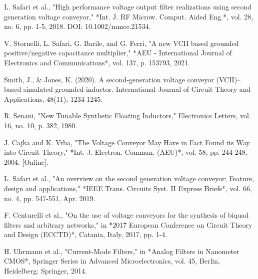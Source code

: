 \documentclass{./styles/svproc}
\begin{document}


\begin{thebibliography}{00}
 L. Safari et al., "High performance voltage output filter realizations using second generation voltage conveyor," *Int. J. RF Microw. Comput. Aided Eng.*, vol. 28, no. 6, pp. 1-5, 2018. DOI: 10.1002/mmce.21534.

V. Stornelli, L. Safari, G. Barile, and G. Ferri, "A new VCII based grounded positive/negative capacitance multiplier," *AEU - International Journal of Electronics and Communications*, vol. 137, p. 153793, 2021.

 Smith, J., \& Jones, K. (2020). A second‐generation voltage conveyor (VCII)–based simulated grounded inductor. International Journal of Circuit Theory and Applications, 48(11), 1234-1245.

 R. Senani, "New Tunable Synthetic Floating Inductors," Electronics Letters, vol. 16, no. 10, p. 382, 1980.

 J. Cajka and K. Vrba, "The Voltage Conveyor May Have in Fact Found its Way into Circuit Theory," *Int. J. Electron. Commun. (AEU)*, vol. 58, pp. 244-248, 2004. [Online].

 L. Safari et al., "An overview on the second generation voltage conveyor: Feature, design and applications," *IEEE Trans. Circuits Syst. II Express Briefs*, vol. 66, no. 4, pp. 547-551, Apr. 2019.

 F. Centurelli et al., "On the use of voltage conveyors for the synthesis of biquad filters and arbitrary networks," in *2017 European Conference on Circuit Theory and Design (ECCTD)*, Catania, Italy, 2017, pp. 1-4.

 H. Uhrmann et al., "Current-Mode Filters," in *Analog Filters in Nanometer CMOS*, Springer Series in Advanced Microelectronics, vol. 45, Berlin, Heidelberg: Springer, 2014.


\end{thebibliography}
\end{document}
